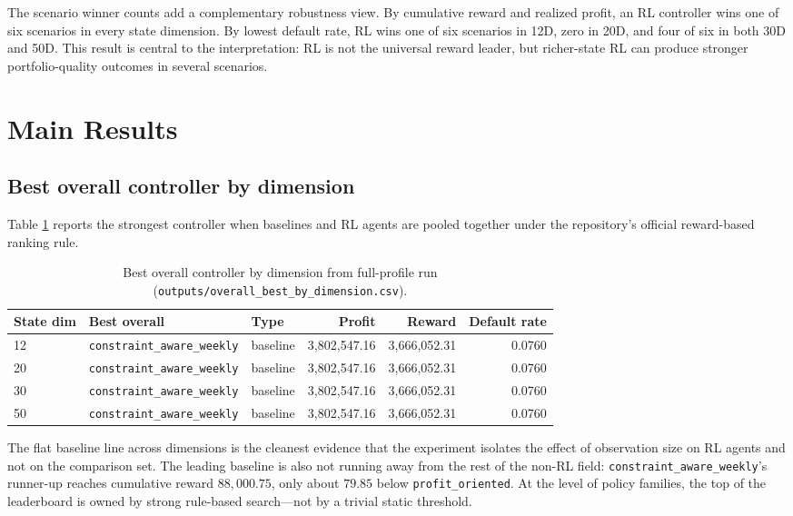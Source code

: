 \documentclass[12pt,a4paper]{article}
\begin{document}
The scenario winner counts add a complementary robustness view. By cumulative reward and realized profit, an RL controller wins one of six scenarios in every state dimension. By lowest default rate, RL wins one of six scenarios in 12D, zero in 20D, and four of six in both 30D and 50D. This result is central to the interpretation: RL is not the universal reward leader, but richer-state RL can produce stronger portfolio-quality outcomes in several scenarios.

\section{Main Results}

\subsection{Best overall controller by dimension}

Table \ref{tab:en-best-overall} reports the strongest controller when baselines and RL agents are pooled together under the repository's official reward-based ranking rule.

\begin{table}[H]
    \centering
    \small
    \begin{tabular}{l l l r r r}
        \toprule
        State dim & Best overall                       & Type     & Profit           & Reward           & Default rate \\
        \midrule
        12        & \texttt{constraint\_aware\_weekly} & baseline & 3{,}802{,}547.16 & 3{,}666{,}052.31 & 0.0760       \\
        20        & \texttt{constraint\_aware\_weekly} & baseline & 3{,}802{,}547.16 & 3{,}666{,}052.31 & 0.0760       \\
        30        & \texttt{constraint\_aware\_weekly} & baseline & 3{,}802{,}547.16 & 3{,}666{,}052.31 & 0.0760       \\
        50        & \texttt{constraint\_aware\_weekly} & baseline & 3{,}802{,}547.16 & 3{,}666{,}052.31 & 0.0760       \\
        \bottomrule
    \end{tabular}
    \caption{Best overall controller by dimension from full-profile run (\texttt{outputs/overall\_best\_by\_dimension.csv}).}
    \label{tab:en-best-overall}
\end{table}

The flat baseline line across dimensions is the cleanest evidence that the experiment isolates the effect of observation size on RL agents and not on the comparison set. The leading baseline is also not running away from the rest of the non-RL field: \texttt{constraint\_aware\_weekly}'s runner-up reaches cumulative reward $88{,}000.75$, only about $79.85$ below \texttt{profit\_oriented}. At the level of policy families, the top of the leaderboard is owned by strong rule-based search---not by a trivial static threshold.
\end{document}
